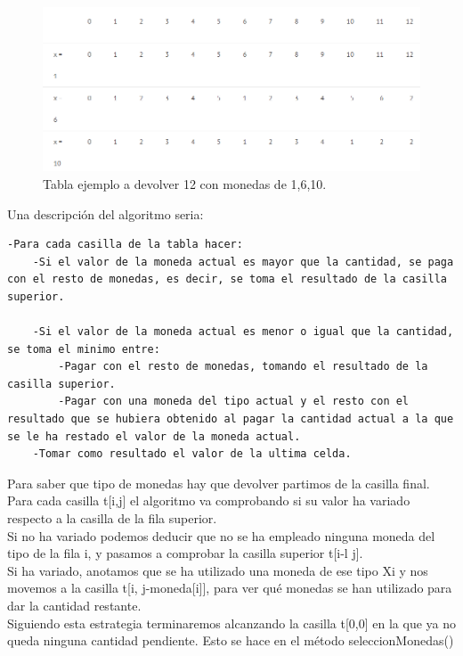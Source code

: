 	
	\begin{figure}[htb]
		\centering
		\includegraphics[width=1.0\textwidth]{./imagenes/3}
		\caption{Tabla ejemplo a devolver 12 con monedas de 1,6,10.} \label{fig:1}
	\end{figure}
	
	Una descripción del algoritmo seria: \\
	
		\lstset{language=C}
	\begin{lstlisting}[frame=single]
-Para cada casilla de la tabla hacer:
	-Si el valor de la moneda actual es mayor que la cantidad, se paga con el resto de monedas, es decir, se toma el resultado de la casilla superior.

	-Si el valor de la moneda actual es menor o igual que la cantidad, se toma el minimo entre:
		-Pagar con el resto de monedas, tomando el resultado de la casilla superior.
		-Pagar con una moneda del tipo actual y el resto con el resultado que se hubiera obtenido al pagar la cantidad actual a la que se le ha restado el valor de la moneda actual.
	-Tomar como resultado el valor de la ultima celda.
	\end{lstlisting} 
	
	Para saber que tipo de monedas hay que devolver partimos de la casilla final. Para cada casilla t[i,j] el algoritmo va comprobando si su valor ha variado respecto a la casilla de la fila superior. \\
	
	Si no ha variado podemos deducir que no se ha empleado ninguna moneda del tipo de la fila i, y pasamos a comprobar la casilla superior t[i-l j].  \\
	Si ha variado, anotamos que se ha utilizado una moneda de ese tipo Xi y nos movemos a la casilla t[i, j-moneda[i]], para ver qué monedas se han utilizado para dar la cantidad restante.\\
	
	Siguiendo esta estrategia terminaremos alcanzando la casilla t[0,0] en la que ya no queda ninguna cantidad pendiente. Esto se hace en el método seleccionMonedas()\\
	 
